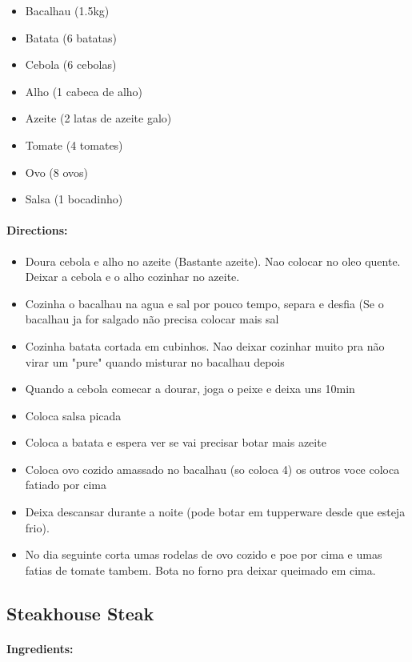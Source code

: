 \documentclass{article}
\begin{document}
\begin{itemize}
	\item Bacalhau (1.5kg)
	\item Batata (6 batatas)
	\item Cebola (6 cebolas)
	\item Alho (1 cabeca de alho)
	\item Azeite (2 latas de azeite galo)
	\item Tomate (4 tomates)
	\item Ovo (8 ovos)
	\item Salsa (1 bocadinho)
\end{itemize}

\paragraph{Directions:}
\begin{itemize}
	\item Doura cebola e alho no azeite (Bastante azeite). Nao colocar no oleo quente. Deixar a cebola e o alho cozinhar no azeite.
	\item Cozinha o bacalhau na agua e sal por pouco tempo, separa e desfia (Se o bacalhau ja for salgado não precisa colocar mais sal
	\item Cozinha batata cortada em cubinhos. Nao deixar cozinhar muito pra não virar um "pure" quando misturar no bacalhau depois
	\item Quando a cebola comecar a dourar, joga o peixe e deixa uns 10min
	\item Coloca salsa picada
	\item Coloca a batata e espera ver se vai precisar botar mais azeite
	\item Coloca ovo cozido amassado no bacalhau (so coloca 4) os outros voce coloca fatiado por cima
	\item Deixa descansar durante a noite (pode botar em tupperware desde que esteja frio).
	\item No dia seguinte corta umas rodelas de ovo cozido e poe por cima e umas fatias de tomate tambem. Bota no forno pra deixar  queimado em cima.
\end{itemize}

\subsection{Steakhouse Steak}

\paragraph{Ingredients:}
\end{document}
